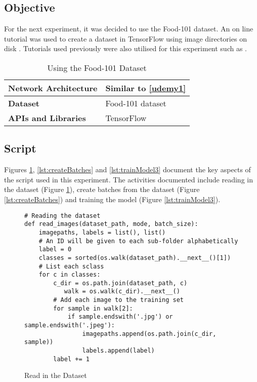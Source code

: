 \tocless\subsection{Objective}
For the next experiment, it was decided to use the Food-101 dataset.
An on line tutorial was used to create a dataset in TensorFlow using image directories on disk \parencite{file_dir_code}.
Tutorials used previously were also utilised for this experiment such as \parencite{udemy}.

\begin{table}[h]
\centering
\caption{Using the Food-101 Dataset}
\label{my-label}
\begin{tabular}{|l|p{8cm}|}
\hline
\textbf{Network Architecture} & Similar to \ref{udemy1}            \\ \hline
\textbf{Dataset}              & Food-101 dataset \\ \hline
\textbf{APIs and Libraries}   & TensorFlow                                                         \\ \hline
\end{tabular}
\end{table}

\tocless\subsection{Script}
Figures \ref{lst:readDataset}, \ref{lst:createBatches} and \ref{lst:trainModel3} document the key aspects of the script used in this experiment.
The activities documented include reading in the dataset (Figure \ref{lst:readDataset}), create batches from the dataset (Figure \ref{lst:createBatches}) and training the model (Figure \ref{lst:trainModel3}).

\begin{figure}[h] 
\caption{Read in the Dataset \parencite{file_dir_code}}
\label{lst:readDataset}
\begin{lstlisting}[style=Python]
# Reading the dataset
def read_images(dataset_path, mode, batch_size):
    imagepaths, labels = list(), list()
    # An ID will be given to each sub-folder alphabetically
    label = 0
    classes = sorted(os.walk(dataset_path).__next__()[1])
    # List each sclass
    for c in classes:
        c_dir = os.path.join(dataset_path, c)
           walk = os.walk(c_dir).__next__()
        # Add each image to the training set
        for sample in walk[2]:
            if sample.endswith('.jpg') or sample.endswith('.jpeg'):
                imagepaths.append(os.path.join(c_dir, sample))
                labels.append(label)
        label += 1
\end{lstlisting}
\end{figure}

